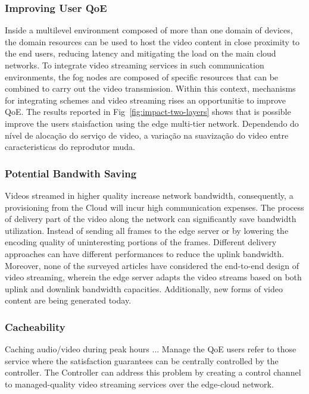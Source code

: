 \subsubsection{Improving User QoE}

Inside a multilevel environment composed of more than one domain of devices, the domain resources can be used to host the video content in close proximity to the end users, reducing latency and mitigating the load on the main cloud networks. To integrate video streaming services in such communication environments, the fog nodes are composed of specific resources that can be combined to carry out the video transmission. Within this context, mechanisms for integrating schemes and video streaming rises an opportunitie to improve QoE.%
The results reported in Fig~\ref{fig:impact-two-layers} shows that is possible improve the users staisfaction using the edge multi-tier network. Dependendo do nível de alocação do serviço de video, a variação na suavização do video entre caracteristicas do reprodutor muda. 

\subsubsection{Potential Bandwith Saving}
Videos streamed in higher quality increase network bandwidth, consequently, a provisioning from the Cloud will incur high communication expenses. 
The process of delivery part of the video along the network can significantly save bandwidth utilization. Instead of sending all frames to the edge server or by lowering the encoding quality of uninteresting portions of the frames. Different delivery approaches can have different performances to reduce the uplink bandwidth. Moreover, none of the surveyed articles have considered the end-to-end design of video streaming, wherein the edge server adapts the video streams based on both uplink and downlink bandwidth capacities. Additionally, new forms of video content are being generated today.


\subsubsection{Cacheability}

Caching audio/video during peak hours ...
Manage the QoE users refer to those service where the satisfaction guarantees can be centrally controlled by the controller. The Controller can address this problem by creating a control channel to managed-quality video streaming services over the edge-cloud network.